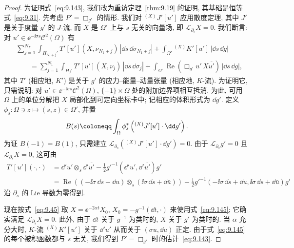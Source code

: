 \begin{proof}
为证明式~\eqref{eq:9.143}, 我们改为重访定理~\ref{thm:9.19} 的证明, 其基础是恒等式~\eqref{eq:9.31}. 先考虑 $P' = \Box_{g'}$ 的情形. 我们对 ${}^{(X)} J'[u']$ 应用散度定理, 其中 $J'$ 是关于度量 $g'$ 的 $J$-流, 而 $X$ 是 $\Omega'$ 上与 $s$ 无关的向量场, 即 $\mathcal{L}_{\partial_s} X = 0$. 我们断言: 对 $u' \in \ee^{-\ii \sigma s}\mathcal{C}^2(\Omega)$ 有
\begin{equation}\label{eq:9.145}
    \begin{aligned}
        &\sum_{j=1}^{N_F} \int_{H_{N_1+j}'} T'[u'](X, \nu_{N_1+j}) \, |\dd s \, \dd \sigma_{N_1+j}| + \int_{\Omega'} {}^{(X)} K'[u'] \, |\dd s \, \dd g| \\
        &\qquad = \sum_{j=1}^{N_1} \int_{H_j'} T'[u'](X, \nu_j) \, |\dd s \, \dd \sigma_j| + \int_{\Omega'} \operatorname{Re}(\Box_{g'} u' \, X \overline{u'}) \, |\dd s \, \dd g|,
    \end{aligned}
\end{equation}
其中 $T'$ (相应地, $K'$) 是关于 $g'$ 的应力--能量--动量张量 (相应地, $K$-流). 为证明它, 只需说明: 对 $u' \in \ee^{-\ii \sigma s}\mathcal{C}^2(\Omega)$, $\{\pm 1\} \times \Omega$ 处的附加边界项相互抵消. 为此, 可用 $\Omega$ 上的单位分解把 $X$ 局部化到可定向坐标卡中; 记相应的体积形式为 $\dd g'$. 定义 $\phi_s \colon \Omega \ni z \mapsto (s, z) \in \Omega'$, 并置
\begin{equation}\label{eq:9.146}
    B(s) \defeq \int_{\Omega} \phi_s^* \left( {}^{(X)} J'[u'] \cdot \dd g' \right).
\end{equation}
为证 $B(-1) = B(1)$, 只需建立 $\mathcal{L}_{\partial_s}({}^{(X)} J'[u'] \cdot \dd g') = 0$. 由于 $\mathcal{L}_{\partial_s} g' = 0$ 且 $\mathcal{L}_{\partial_s} X = 0$, 这可由
\begin{equation}\label{eq:9.147}
    \begin{aligned}
        T'[u'](\cdot, \cdot) &= \dd' u' \otimes_s \dd' \overline{u'} - \frac12 g'^{-1}(\dd' u', \dd' \overline{u'}) g' \\
        &= \operatorname{Re}\left( (-\ii \sigma \, \dd s + \dd u) \otimes_s (\ii \sigma \, \dd s + \dd \bar u) \right) - \frac12 g'^{-1}(-\ii \sigma \, \dd s + \dd u, \ii \sigma \, \dd s + \dd \bar u) g'
    \end{aligned}
\end{equation}
沿 $\partial_s$ 的 Lie 导数为零得到.

现在按式~\eqref{eq:9.45} 取 $X = \ee^{-2\alpha t} X_0$, $X_0 = -g^{-1}(\dd t, \cdot)$ 来使用式~\eqref{eq:9.145}; 它确实满足 $\mathcal{L}_{\partial_s} X = 0$. 此外, 由于 $\dd t$ 关于 $g^{-1}$ 为类时的, $X$ 关于 $g'$ 为类时的. 当 $\alpha$ 充分大时, $K$-流 ${}^{(X)} K'[u']$ 关于 $\dd' u'$ 从而关于 $(\sigma u, \dd u)$ 正定. 由于式~\eqref{eq:9.145} 的每个被积函数都与 $s$ 无关, 我们得到 $P' = \Box_{g'}$ 时的估计~\eqref{eq:9.143}.


\end{proof}
